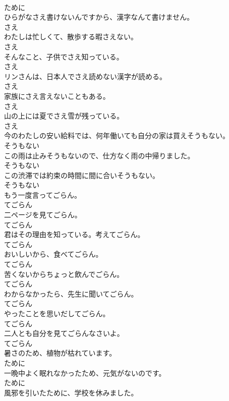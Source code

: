 \documentclass[8pt]{extreport}
\begin{document}
\begin{CJK}{UTF8}{min}
\\	ために
\\	ひらがなさえ書けないんですから、漢字なんて書けません。	
\\	さえ
\\	わたしは忙しくて、散歩する暇さえない。	
\\	さえ
\\	そんなこと、子供でさえ知っている。	
\\	さえ
\\	リンさんは、日本人でさえ読めない漢字が読める。	
\\	さえ
\\	家族にさえ言えないこともある。	
\\	さえ
\\	山の上には夏でさえ雪が残っている。	
\\	さえ
\\	今のわたしの安い給料では、何年働いても自分の家は買えそうもない。	
\\	そうもない
\\	この雨は止みそうもないので、仕方なく雨の中帰りました。	
\\	そうもない
\\	この渋滞では約束の時間に間に合いそうもない。	
\\	そうもない
\\	もう一度言ってごらん。	
\\	てごらん
\\	二ページを見てごらん。	
\\	てごらん
\\	君はその理由を知っている。考えてごらん。	
\\	てごらん
\\	おいしいから、食べてごらん。	
\\	てごらん
\\	苦くないからちょっと飲んでごらん。	
\\	てごらん
\\	わからなかったら、先生に聞いてごらん。	
\\	てごらん
\\	やったことを思いだしてごらん。	
\\	てごらん
\\	二人とも自分を見てごらんなさいよ。	
\\	てごらん
\\	暑さのため、植物が枯れています。	
\\	ために
\\	一晩中よく眠れなかったため、元気がないのです。	
\\	ために
\\	風邪を引いたために、学校を休みました。	

\end{CJK}
\end{document}
